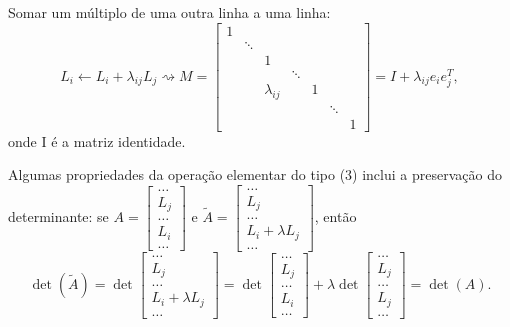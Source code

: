 \documentclass[../numerical_methods.tex]{subfiles}
\begin{document}
Somar um múltiplo de uma outra linha a uma linha:
\[
	L_{i}\leftarrow L_{i}+\lambda_{ij}L_{j} \rightsquigarrow M = \begin{bmatrix}
		1 &        &              &        &   &        &   \\
		  & \ddots &              &        &   &        &   \\
		  &        & 1            &        &   &        &   \\
		  &        &              & \ddots &   &        &   \\
		  &        & \lambda_{ij} &        & 1 &        &   \\
		  &        &              &        &   & \ddots &   \\
		  &        &              &        &   &        & 1
	\end{bmatrix} = I + \lambda_{ij}e_{i}e_{j}^{T},
\]
onde I é a matriz identidade.

Algumas propriedades da operação elementar do tipo (3) inclui a preservação do determinante: se
\(A = \begin{bmatrix}
	\dotsc \\
	L_{j}  \\
	\dotsc \\
	L_{i}  \\
	\dotsc
\end{bmatrix}\) e \(\tilde{A} = \begin{bmatrix}
	\dotsc              \\
	L_{j}               \\
	\dotsc              \\
	L_{i}+\lambda L_{j} \\
	\dotsc
\end{bmatrix}\), então
\[
	\det{(\tilde{A})} = \det \begin{bmatrix}
		\dotsc                \\
		L_{j}                 \\
		\dotsc                \\
		L_{i} + \lambda L_{j} \\
		\dotsc
	\end{bmatrix} = \det \begin{bmatrix}
		\dotsc \\
		L_{j}  \\
		\dotsc \\
		L_{i}  \\
		\dotsc
	\end{bmatrix} + \lambda \det \begin{bmatrix}
		\dotsc \\
		L_{j}  \\
		\dotsc \\
		L_{j}  \\
		\dotsc
	\end{bmatrix} = \det{(A)}.
\]
\end{document}
